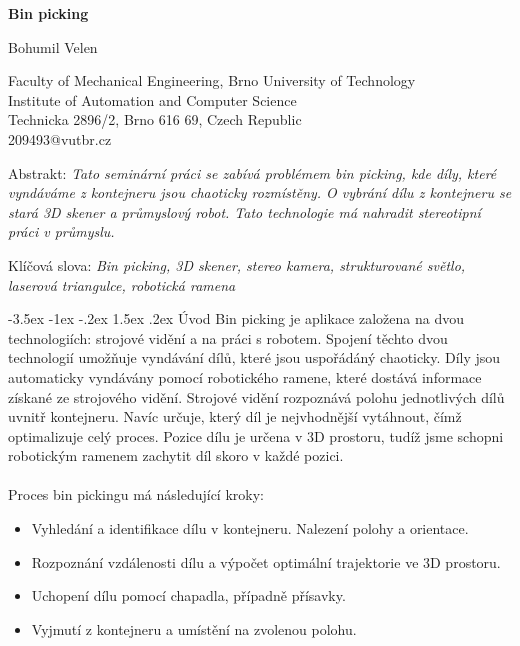 \documentclass[a4paper,11pt]{article}
\makeatletter
\theoremstyle{definition}
\renewcommand\section{\@startsection {section}{1}{\z@}%
                                   {-3.5ex \@plus -1ex \@minus -.2ex}%
                                   {1.5ex \@plus.2ex}%
                                   {\large\bfseries}}
\makeatother
\begin{document}
\pagestyle{empty}

\begin{center}
{\bf \Large Bin picking}
\end{center}

\smallskip
\begin{center}
{\large Bohumil Velen}
\end{center}

\smallskip
\begin{center}
Faculty of Mechanical Engineering, Brno University of Technology\\
Institute of Automation and Computer Science\\
Technicka 2896/2, Brno 616 69, Czech Republic\\
209493@vutbr.cz\\
\end{center}

\bigskip
\noindent Abstrakt: \textit{Tato seminární práci se zabívá problémem bin picking, kde díly, které vyndáváme z kontejneru jsou chaoticky rozmístěny. O vybrání dílu z kontejneru se stará 3D skener a průmyslový robot. Tato technologie má nahradit stereotipní práci v průmyslu.}

\vspace*{10pt} \noindent Klíčová slova: \textit{Bin picking, 3D skener, stereo kamera, strukturované světlo, laserová triangulce, robotická ramena}

\bigskip
\section{Úvod}
\label{sec:1}
Bin picking je aplikace založena na dvou technologiích: strojové vidění a na práci s robotem. Spojení těchto dvou technologií umožňuje vyndávání dílů, které jsou uspořádáný chaoticky. Díly jsou automaticky vyndávány pomocí robotického ramene, které dostává informace získané ze strojového vidění. Strojové vidění rozpoznává polohu jednotlivých dílů uvnitř kontejneru. Navíc určuje, který díl je nejvhodnější vytáhnout, čímž optimalizuje celý proces. Pozice dílu je určena v 3D prostoru, tudíž jsme schopni robotickým ramenem zachytit díl skoro v každé pozici. \cite{6415038,5756828} 
\\
\\Proces bin pickingu má následující kroky:

\begin{itemize}
\item Vyhledání a identifikace dílu v kontejneru. Nalezení polohy a orientace.
\item Rozpoznání vzdálenosti dílu a výpočet optimální trajektorie ve 3D prostoru.
\item Uchopení dílu pomocí chapadla, případně přísavky. 
\item Vyjmutí z kontejneru a umístění na zvolenou polohu.
\end{itemize}
\end{document}
